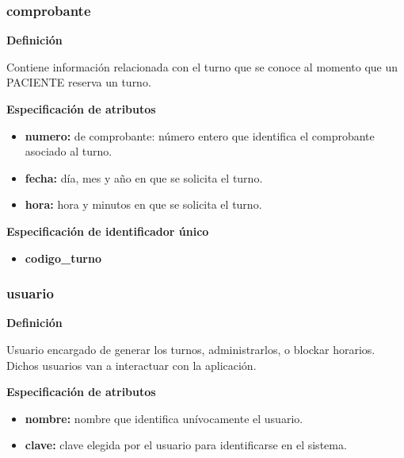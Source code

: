 \documentclass[a4paper,11pt]{article}
\begin{document}
\subsubsection{\textbf{comprobante}}

\textbf{Definición}

Contiene información relacionada con el turno que se conoce al momento que un 
PACIENTE reserva un turno.

\textbf{Especificación de atributos}

\begin{itemize}

     \item \textbf{numero:} de comprobante: número entero que identifica el comprobante asociado 
     al turno.

     \item \textbf{fecha:} día, mes y año en que se solicita el turno.

     \item \textbf{hora:} hora y minutos en que se solicita el turno.

\end{itemize}

\textbf{Especificación de identificador único}

\begin{itemize}

     \item \textbf{codigo\_turno}


\end{itemize}

\subsubsection{\textbf{usuario}}

\textbf{Definición}

Usuario encargado de generar los turnos, administrarlos, o blockar horarios.
Dichos usuarios van a interactuar con la aplicación.

\textbf{Especificación de atributos}

\begin{itemize}

    \item \textbf{nombre:} nombre que identifica unívocamente el usuario. 
	 
    \item \textbf{clave:} clave elegida por el usuario para identificarse en el sistema. 

\end{itemize}
\end{document}
